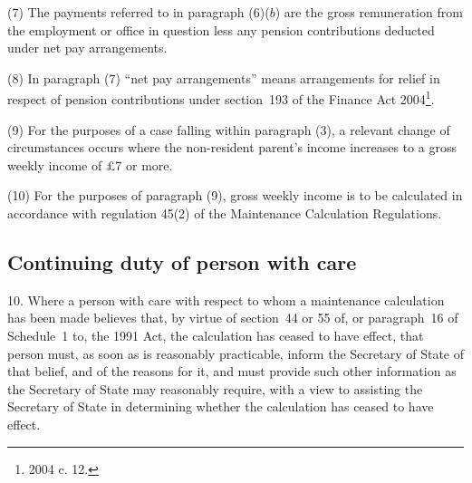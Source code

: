 \documentclass[12pt,a4paper]{article}
\begin{document}
(7) The payments referred to in paragraph (6)($b$)  are the gross remuneration from the employment or office in question less any pension contributions deducted under net pay arrangements.

(8) In paragraph (7) “net pay arrangements” means arrangements for relief in respect of pension contributions under section~193 of the Finance Act 2004\footnote{2004 c. 12.}.

(9) For the purposes of a case falling within paragraph (3), a relevant change of circumstances occurs where the non-resident parent’s income increases to a gross weekly income of 
£7  %
or more.

(10) For the purposes of paragraph (9), gross weekly income is to be calculated in accordance with regulation 45(2) of the Maintenance Calculation Regulations.


\subsection[10. Continuing duty of person with care]{Continuing duty of person with care}

10.  Where a person with care with respect to whom a maintenance calculation has been made believes that, by virtue of section~44 or 55 of, or paragraph~16 of Schedule~1 to, the 1991 Act, the calculation has ceased to have effect, that person must, as soon as is reasonably practicable, inform the 
Secretary of State  %
of that belief, and of the reasons for it, and must provide such other information as the 
Secretary of State  %
may reasonably require, with a view to assisting the 
Secretary of State  %
in determining whether the calculation has ceased to have effect.

\end{document}
